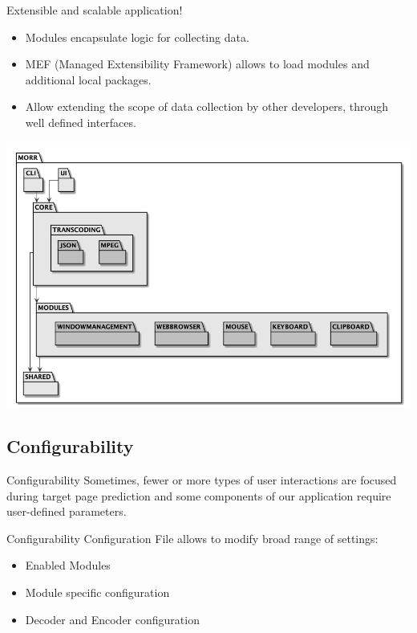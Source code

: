 \documentclass[aspectratio=169]{beamer}
\begin{document}
   \begin{frame}{Extensible and scalable application!}
   		\begin{itemize}
            \item Modules encapsulate logic for collecting data.
            \item MEF (Managed Extensibility Framework) allows to load modules and additional local packages.
            \item Allow extending the scope of data collection by other developers, through well defined interfaces.
    	\end{itemize}
   \end{frame}
   
   \begin{frame}
   		\includegraphics[width=0.8\linewidth]{resources/AllPackages.png}
   \end{frame}
   
   \subsection{Configurability}
   \begin{frame}{Configurability}
       Sometimes, fewer or more types of user interactions are focused during target page prediction and some components of our application require user-defined parameters.
   \end{frame}
   
   \begin{frame}{Configurability}
   		Configuration File allows to modify broad range of settings:
   		\begin{itemize}
			\item Enabled Modules
			\item Module specific configuration
			\item Decoder and Encoder configuration
		\end{itemize}
   \end{frame}
   
\end{document}
